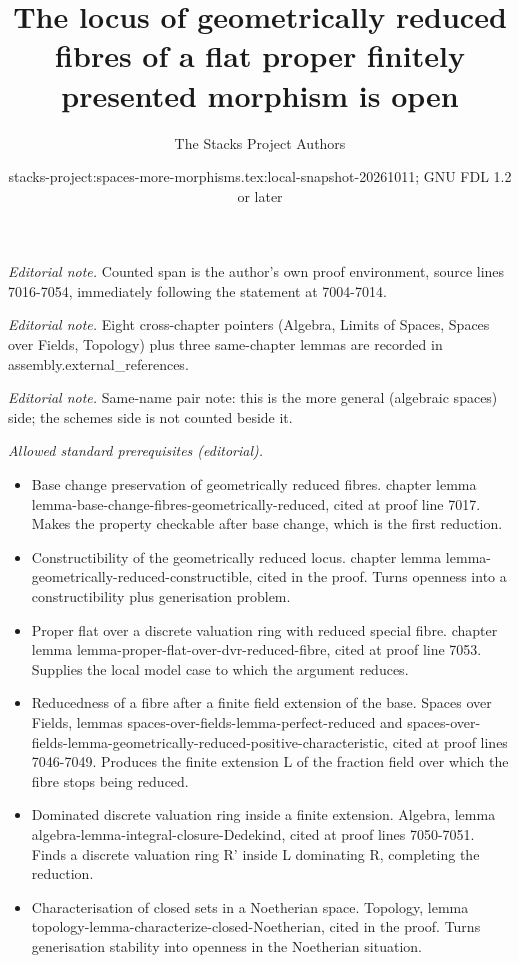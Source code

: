 \documentclass[10pt,a4paper]{amsart}
\title{The locus of geometrically reduced fibres of a flat proper finitely presented morphism is open}
\author{The Stacks Project Authors}
\date{stacks-project:spaces-more-morphisms.tex:local-snapshot-20261011; GNU FDL 1.2 or later}
\theoremstyle{plain}
\theoremstyle{definition}
\theoremstyle{remark}
\numberwithin{equation}{subsection}
\begin{document}
\maketitle
\noindent\textit{Editorial note.} Counted span is the author's own proof environment, source lines 7016-7054, immediately following the statement at 7004-7014.\par\medskip
\noindent\textit{Editorial note.} Eight cross-chapter pointers (Algebra, Limits of Spaces, Spaces over Fields, Topology) plus three same-chapter lemmas are recorded in assembly.external\_references.\par\medskip
\noindent\textit{Editorial note.} Same-name pair note: this is the more general (algebraic spaces) side; the schemes side is not counted beside it.\par\medskip
\noindent\textit{Allowed standard prerequisites (editorial).}\begin{itemize}
\item Base change preservation of geometrically reduced fibres. chapter lemma lemma-base-change-fibres-geometrically-reduced, cited at proof line 7017. Makes the property checkable after base change, which is the first reduction.
\item Constructibility of the geometrically reduced locus. chapter lemma lemma-geometrically-reduced-constructible, cited in the proof. Turns openness into a constructibility plus generisation problem.
\item Proper flat over a discrete valuation ring with reduced special fibre. chapter lemma lemma-proper-flat-over-dvr-reduced-fibre, cited at proof line 7053. Supplies the local model case to which the argument reduces.
\item Reducedness of a fibre after a finite field extension of the base. Spaces over Fields, lemmas spaces-over-fields-lemma-perfect-reduced and spaces-over-fields-lemma-geometrically-reduced-positive-characteristic, cited at proof lines 7046-7049. Produces the finite extension L of the fraction field over which the fibre stops being reduced.
\item Dominated discrete valuation ring inside a finite extension. Algebra, lemma algebra-lemma-integral-closure-Dedekind, cited at proof lines 7050-7051. Finds a discrete valuation ring R' inside L dominating R, completing the reduction.
\item Characterisation of closed sets in a Noetherian space. Topology, lemma topology-lemma-characterize-closed-Noetherian, cited in the proof. Turns generisation stability into openness in the Noetherian situation.
\end{itemize}\medskip
\end{document}
